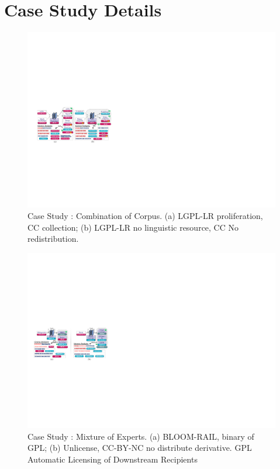 \section{Case Study Details}


\begin{figure}[t]
    \centering
    \includegraphics[width=\linewidth]{fig/case1.pdf}
    \caption{Case Study : Combination of Corpus. (a) LGPL-LR proliferation, CC collection; (b) LGPL-LR no linguistic resource, CC No redistribution.}
    \Description{}
    \label{fig:case1}
\end{figure}

\begin{figure}[t]
    \centering
    \includegraphics[width=\linewidth]{fig/case2.pdf}
    \caption{Case Study : Mixture of Experts. (a) BLOOM-RAIL, binary of GPL; (b) Unlicense, CC-BY-NC no distribute derivative. GPL Automatic Licensing of Downstream Recipients}
    \Description{}
    \label{fig:case2}
\end{figure}

